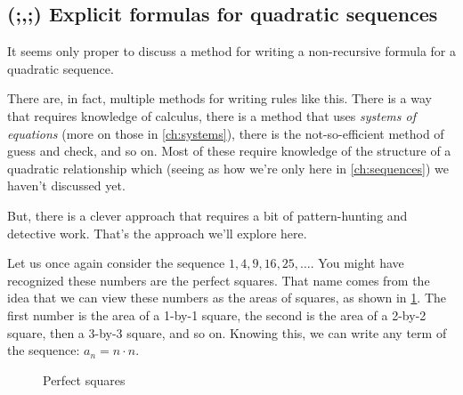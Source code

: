 \subsection{(;,;) Explicit formulas for quadratic sequences}

It seems only proper to discuss a method for writing a non-recursive formula for a quadratic sequence.

There are, in fact, multiple methods for writing rules like this. There is a way that requires knowledge of calculus, there is a method that uses \textit{systems of equations} (more on those in \cref{ch:systems}), there is the not-so-efficient method of guess and check, and so on. Most of these require knowledge of the structure of a quadratic relationship which (seeing as how we're only here in \cref{ch:sequences}) we haven't discussed yet.

But, there is a clever approach that requires a bit of pattern-hunting and detective work. That's the approach we'll explore here.

Let us once again consider the sequence $1, 4, 9, 16, 25, \dotsc$. You might have recognized these numbers are the \glspl{perfect square}. That name comes from the idea that we can view these numbers as the areas of squares, as shown in \cref{fig:perfsq}. The first number is the area of a 1-by-1 square, the second is the area of a 2-by-2 square, then a 3-by-3 square, and so on. Knowing this, we can write any term of the sequence: $a_n = n \cdot n$.

\begin{figure}
\centering
{}
\caption{Perfect squares}
\label{fig:perfsq}
\end{figure}%


